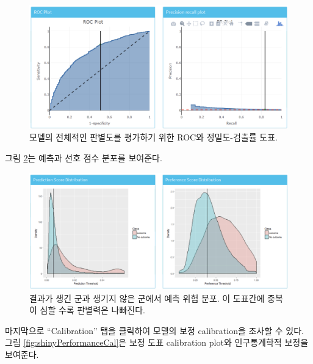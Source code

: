\documentclass[10.5pt]{book}
\theoremstyle{definition}
\theoremstyle{definition}
\theoremstyle{definition}
\theoremstyle{remark}
\begin{document}
\begin{figure}

{\centering \includegraphics[width=1\linewidth]{images/PatientLevelPrediction/shiny/shinyPerformanceDisc} 

}

\caption{모델의 전체적인 판별도를 평가하기 위한 ROC와 정밀도-검출률 도표.}\label{fig:shinyPerformanceDisc}
\end{figure}

그림 \ref{fig:shinyPerformanceDist}는 예측과 선호 점수 분포를 보여준다.

\begin{figure}

{\centering \includegraphics[width=1\linewidth]{images/PatientLevelPrediction/shiny/shinyPerformanceDist} 

}

\caption{결과가 생긴 군과 생기지 않은 군에서 예측 위험 분포. 이 도표간에 중복이 심할 수록 판별력은 나빠진다.}\label{fig:shinyPerformanceDist}
\end{figure}

마지막으로 ``Calibration'' 탭을 클릭하여 모델의 보정 calibration을
조사할 수 있다. 그림 \ref{fig:shinyPerformanceCal}은 보정 도표
calibration plot와 인구통계학적 보정을 보여준다.
\end{document}
